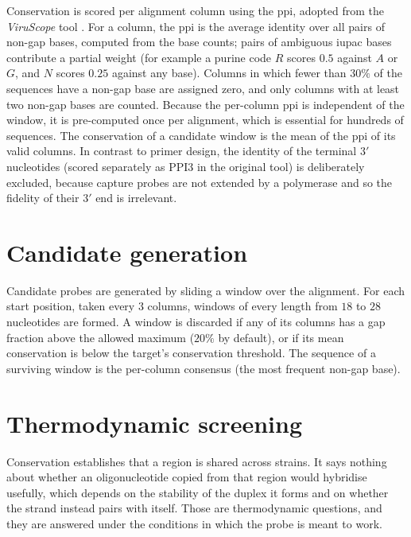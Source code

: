 Conservation is scored per alignment column using the \acrshort{ppi}, adopted from the \emph{ViruScope}
tool \citep{viruscope}. For a column, the \acrshort{ppi} is the average identity over all pairs of
non-gap bases, computed from the base counts; pairs of ambiguous \acrshort{iupac} bases contribute a
partial weight (for example a purine code $R$ scores $0.5$ against $A$ or $G$, and $N$ scores $0.25$
against any base).
Columns in which fewer than $30\%$ of the sequences have a non-gap base are assigned zero, and only
columns with at least two non-gap bases are counted. Because the per-column \acrshort{ppi} is independent
of the window, it is pre-computed once per alignment, which is essential for hundreds of sequences. The
conservation of a candidate window is the mean of the \acrshort{ppi} of its valid columns. In contrast to
primer design, the identity of the terminal $3'$ nucleotides (scored separately as PPI3 in the original
tool) is deliberately excluded, because capture probes are not extended by a polymerase and so the fidelity
of their $3'$ end is irrelevant.

\section{Candidate generation}

Candidate probes are generated by sliding a window over the alignment. For each start position, taken every
$3$ columns, windows of every length from $18$ to $28$ nucleotides are formed. A window is discarded if
any of its columns has a gap fraction above the allowed maximum ($20\%$ by default), or if its mean
conservation is below the target's conservation threshold. The sequence of a surviving window is the
per-column consensus (the most frequent non-gap base).

\section{Thermodynamic screening}
\label{sec:thermo}

Conservation establishes that a region is shared across strains. It says nothing about whether an
oligonucleotide copied from that region would hybridise usefully, which depends on the stability
of the duplex it forms and on whether the strand instead pairs with itself. Those are
thermodynamic questions, and they are answered under the conditions in which the probe is meant
to work.

